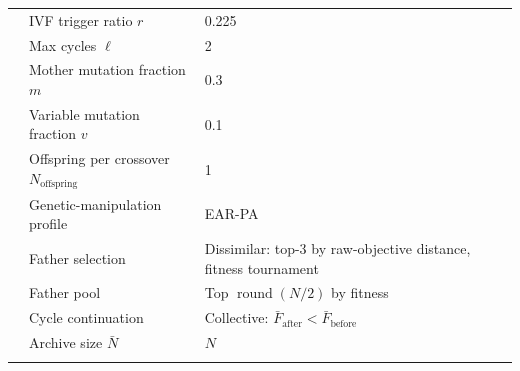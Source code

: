 \documentclass[pdflatex,sn-mathphys-ay]{sn-jnl}%
\theoremstyle{thmstyleone}%
\theoremstyle{thmstyletwo}%
\theoremstyle{thmstylethree}%
\begin{document}
\begin{table}[!htbp]
\begin{tabularx}{\textwidth}{@{} l X X @{}}
		                   & IVF trigger ratio $r$                          & 0.225                                                           \\
		                   & Max cycles $\ell$                              & 2                                                               \\
		                   & Mother mutation fraction $m$                   & 0.3                                                             \\
		                   & Variable mutation fraction $v$                 & 0.1                                                             \\
		                   & Offspring per crossover $N_{\text{offspring}}$ & 1                                                               \\
		                   & Genetic-manipulation profile                   & EAR-PA                                                          \\
		                   & Father selection                               & Dissimilar: top-3 by raw-objective distance, fitness tournament \\
		                   & Father pool                                    & Top $\operatorname{round}(N/2)$ by fitness                      \\
		                   & Cycle continuation                             & Collective: $\bar{F}_\text{after} < \bar{F}_\text{before}$      \\
		                   & Archive size $\bar{N}$                         & $N$                                                             \\
		\botrule
	\end{tabularx}
\end{table}
\end{document}
